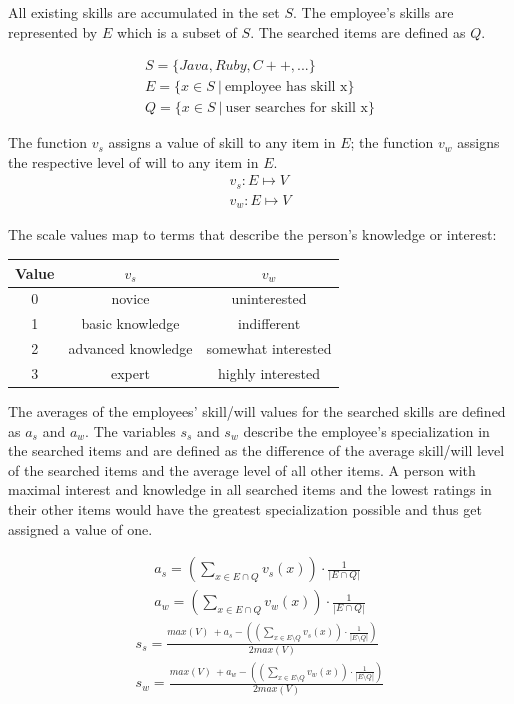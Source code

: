 All existing skills are accumulated in the set $S$. The employee's skills are represented by $E$ which is a subset of $S$. The searched items are
defined as $Q$.

\begin{gather*}
  S = \{Java, Ruby, C++, ...\} \\
  E = \{x \in S \ | \ \textrm{employee has skill x}\} \\
  Q = \{x \in S \ | \ \textrm{user searches for skill x}\}
\end{gather*}

The function $v_s$ assigns a value of skill to any item in $E$; the function $v_w$ assigns the respective level of will to any item in $E$.
\begin{gather*}
  v_s: E \mapsto V \\
  v_w: E \mapsto V
\end{gather*}

\newpage
The scale values map to terms that describe the person's knowledge or interest:
\begin{center}
\begin{tabular}{c|c|c}
	Value & $v_s$ & $v_w$ \\
	\hline
	0 & novice & uninterested\\
	1 & basic knowledge & indifferent\\
	2 & advanced knowledge & somewhat interested\\
	3 & expert & highly interested\\
\end{tabular}
\end{center}

The averages of the employees' skill/will values for the searched skills are defined as $a_s$ and $a_w$.
The variables $s_s$ and $s_w$ describe the employee's specialization in the searched items and are defined as the difference
of the average skill/will level of the searched items and the average level of all other items.
A person with maximal interest and knowledge in all searched items and the lowest ratings in their other items would have the greatest specialization possible and thus get assigned a value of one.

\begin{gather*}
  a_s = \left( \sum_{x \in E \cap Q} v_s(x) \right) \cdot \frac{1}{|E \cap Q|} \\
  a_w = \left( \sum_{x \in E \cap Q} v_w(x) \right) \cdot \frac{1}{|E \cap Q|}
\end{gather*}
\begin{gather*}
  s_s = \frac{max(V) \ + a_s - \left( \left( \sum_{x \in E \setminus Q} v_s(x)\right) \cdot \frac{1}{|E \setminus Q|} \right)}{2 max(V)}\\
  s_w = \frac{max(V) \ + a_w - \left( \left( \sum_{x \in E \setminus Q} v_w(x)\right) \cdot \frac{1}{|E \setminus Q|} \right)}{2 max(V)}
\end{gather*}

